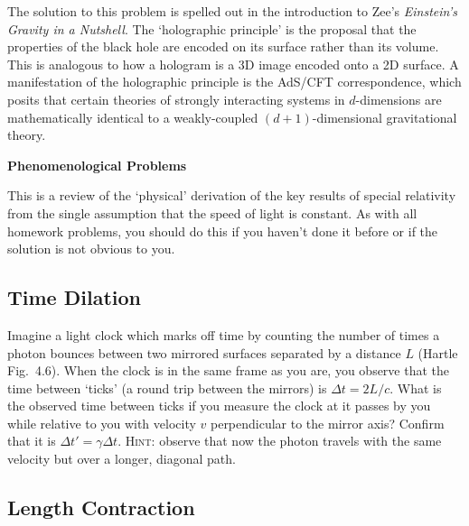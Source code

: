 \documentclass[12pt]{article}
\numberwithin{equation}{section}    %
\begin{document}
The solution to this problem is spelled out in  the introduction to Zee's \emph{Einstein's Gravity in a Nutshell}. The `holographic principle' is the proposal that the properties of the black hole are encoded on its surface rather than its volume. This is analogous to how a hologram is a 3D image encoded onto a 2D surface. A manifestation of the holographic principle is the AdS/CFT correspondence, which posits that certain theories of strongly interacting systems in $d$-dimensions are mathematically identical to a weakly-coupled $(d+1)$-dimensional gravitational theory.




\vspace{2em}
{\Large\textbf{\textsf{Phenomenological Problems}}}

This is a review of the `physical' derivation of the key results of special relativity from the single assumption that the speed of light is constant. As with all homework problems, you should do this if you haven't done it before or if the solution is not obvious to you.

\subsection{Time Dilation}

Imagine a light clock which marks off time by counting the number of times a photon bounces between two mirrored surfaces separated by a distance $L$ (Hartle Fig.~4.6). When the clock is in the same frame as you are, you observe that the time between `ticks' (a round trip between the mirrors) is $\Delta t = 2L/c$. What is the observed time between ticks if you measure the clock at it passes by you while relative to you with velocity $v$ perpendicular to the mirror axis? Confirm that it is $\Delta t' = \gamma \Delta t$. \textsc{Hint}: observe that now the photon travels with the same velocity but over a longer, diagonal path. 

\subsection{Length Contraction}
\end{document}
